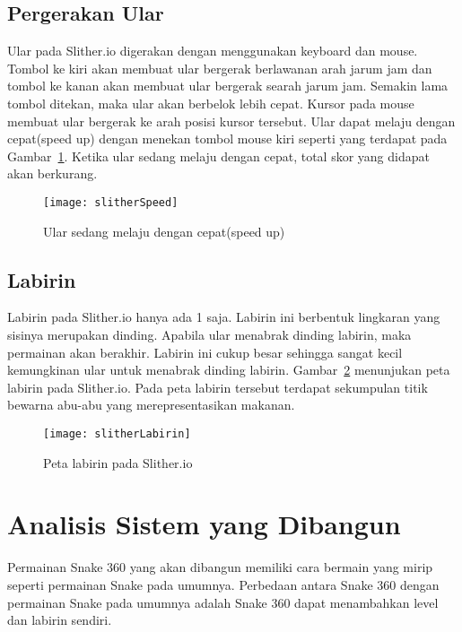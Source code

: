 \subsection{Pergerakan Ular}
Ular pada Slither.io digerakan dengan menggunakan keyboard dan mouse. Tombol ke kiri akan membuat ular bergerak berlawanan arah jarum jam dan tombol ke kanan akan membuat ular bergerak searah jarum jam. Semakin lama tombol ditekan, maka ular akan berbelok lebih cepat. Kursor pada mouse membuat ular bergerak ke arah posisi kursor tersebut. Ular dapat melaju dengan cepat(speed up) dengan menekan tombol mouse kiri seperti yang terdapat pada Gambar~\ref{fig:slitherSpeed}. Ketika ular sedang melaju dengan cepat, total skor yang didapat akan berkurang. 

\begin{figure}[H]
	\centering  
	\texttt{[image: slitherSpeed]}  
	\caption[Ular sedang melaju dengan cepat(speed up)]{Ular sedang melaju dengan cepat(speed up)}
	\label{fig:slitherSpeed} 
\end{figure}

\subsection{Labirin}
Labirin pada Slither.io hanya ada 1 saja. Labirin ini berbentuk lingkaran yang sisinya merupakan dinding. Apabila ular menabrak dinding labirin, maka permainan akan berakhir. Labirin ini cukup besar sehingga sangat kecil kemungkinan ular untuk menabrak dinding labirin. Gambar~\ref{fig:slitherLabirin} menunjukan peta labirin pada Slither.io. Pada peta labirin tersebut terdapat sekumpulan titik bewarna abu-abu yang merepresentasikan makanan.

\begin{figure}[H]
	\centering  
	\texttt{[image: slitherLabirin]}  
	\caption[Peta labirin pada Slither.io]{Peta labirin pada Slither.io}
	\label{fig:slitherLabirin} 
\end{figure}

\section{Analisis Sistem yang Dibangun}
Permainan Snake 360 yang akan dibangun memiliki cara bermain yang mirip seperti permainan Snake pada umumnya. Perbedaan antara Snake 360 dengan permainan Snake pada umumnya adalah Snake 360 dapat menambahkan level dan labirin sendiri. 

